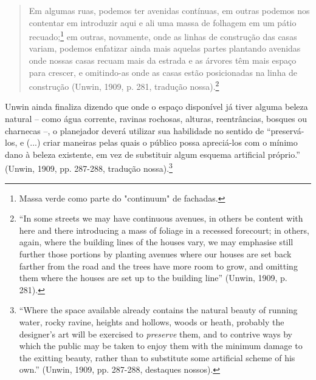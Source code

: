 \documentclass[12pt, a4paper]{book} %
\begin{document}
        \begin{quotation}
            Em algumas ruas, podemos ter avenidas contínuas, em outras podemos nos contentar em introduzir aqui e ali uma massa de folhagem em um pátio recuado;\footnote[96]{Massa verde como parte do "continuum" de fachadas.} em outras, novamente, onde as linhas de construção das casas variam, podemos enfatizar ainda mais aquelas partes plantando avenidas onde nossas casas recuam mais da estrada e as árvores têm mais espaço para crescer, e omitindo-as onde as casas estão posicionadas na linha de construção (Unwin, 1909, p. 281, tradução nossa).\footnote[97]{``In some streets we may have continuous avenues, in others be content with here and there introducing a mass of foliage in a recessed forecourt; in others, again, where the building lines of the houses vary, we may emphasise still further those portions by planting avenues where our houses are set back farther from the road and the trees have more room to grow, and omitting them where the houses are set up to the building line'' (Unwin, 1909, p. 281).}
        \end{quotation}

        Unwin ainda finaliza dizendo que onde o espaço disponível já tiver alguma beleza natural – como água corrente, ravinas rochosas, alturas, reentrâncias, bosques ou charnecas –, o planejador deverá utilizar sua habilidade no sentido de ``preservá-los, e (...) criar maneiras pelas quais o público possa apreciá-los com o mínimo dano à beleza existente, em vez de substituir algum esquema artificial próprio.'' (Unwin, 1909, pp. 287-288, tradução nossa).\footnote[98]{``Where the space available already contains the natural beauty of running water, rocky ravine, heights and hollows, woods or heath, probably the designer's art will be exercised to \textit{preserve} them, and to contrive ways by which the public may be taken to enjoy them with the minimum damage to the exitting beauty, rather than to substitute some artificial scheme of his own.'' (Unwin, 1909, pp. 287-288, destaques nossos).}
\end{document}
